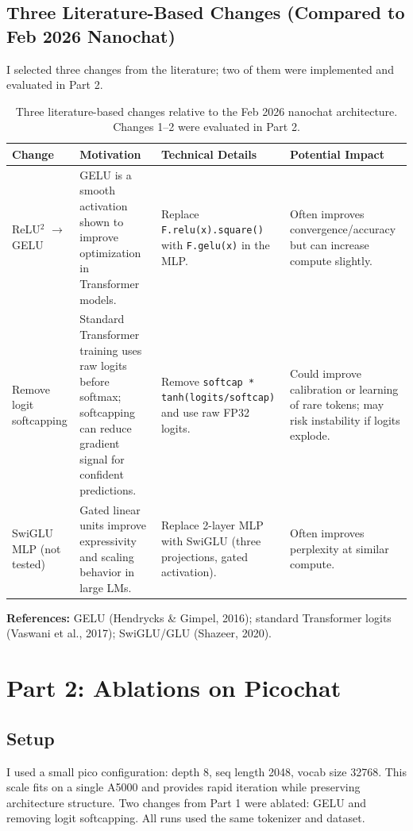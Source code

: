 \documentclass[11pt]{article}
\begin{document}
\subsection*{Three Literature-Based Changes (Compared to Feb 2026 Nanochat)}
I selected three changes from the literature; two of them were implemented and evaluated in Part 2.

\begin{table}[h]
\centering
\begin{tabular}{p{3.2cm} p{4.3cm} p{5.1cm} p{3.3cm}}
\toprule
\textbf{Change} & \textbf{Motivation} & \textbf{Technical Details} & \textbf{Potential Impact} \\
\midrule
ReLU$^2$ $\rightarrow$ GELU & GELU is a smooth activation shown to improve optimization in Transformer models. & Replace \texttt{F.relu(x).square()} with \texttt{F.gelu(x)} in the MLP. & Often improves convergence/accuracy but can increase compute slightly. \\
\addlinespace
Remove logit softcapping & Standard Transformer training uses raw logits before softmax; softcapping can reduce gradient signal for confident predictions. & Remove \texttt{softcap * tanh(logits/softcap)} and use raw FP32 logits. & Could improve calibration or learning of rare tokens; may risk instability if logits explode. \\
\addlinespace
SwiGLU MLP (not tested) & Gated linear units improve expressivity and scaling behavior in large LMs. & Replace 2-layer MLP with SwiGLU (three projections, gated activation). & Often improves perplexity at similar compute. \\
\bottomrule
\end{tabular}
\caption{Three literature-based changes relative to the Feb 2026 nanochat architecture. Changes 1--2 were evaluated in Part 2.}
\end{table}

\textbf{References:} GELU (Hendrycks \& Gimpel, 2016); standard Transformer logits (Vaswani et al., 2017); SwiGLU/GLU (Shazeer, 2020).

\section*{Part 2: Ablations on Picochat}

\subsection*{Setup}
I used a small pico configuration: depth 8, seq length 2048, vocab size 32768. This scale fits on a single A5000 and provides rapid iteration while preserving architecture structure. Two changes from Part 1 were ablated: GELU and removing logit softcapping. All runs used the same tokenizer and dataset.
\end{document}
